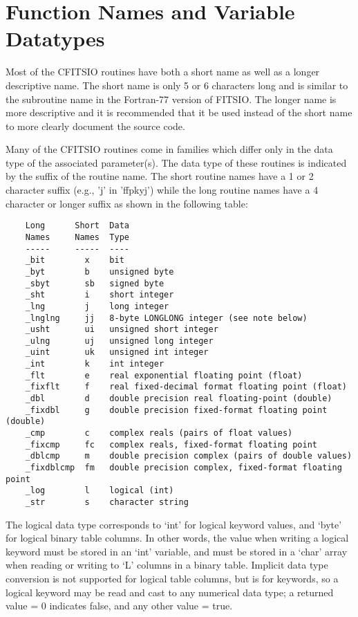 \documentclass[11pt]{book}
\begin{document}
\section{Function Names and Variable Datatypes}

Most of the CFITSIO routines have both a short name as well as a
longer descriptive name.  The short name is only 5 or 6 characters long
and is similar to the subroutine name in the Fortran-77 version of
FITSIO.  The longer name is more descriptive and it is recommended that
it be used instead of the short name to more clearly document the
source code.

Many of the CFITSIO routines come in families which differ only in the
data type of the associated parameter(s).  The data type of these
routines is indicated by the suffix of the routine name.  The short
routine names have a 1 or 2 character suffix (e.g., 'j' in 'ffpkyj')
while the long routine names have a 4 character or longer suffix
as shown in the following table:

\begin{verbatim}
    Long      Short  Data
    Names     Names  Type
    -----     -----  ----
    _bit        x    bit
    _byt        b    unsigned byte
    _sbyt       sb   signed byte
    _sht        i    short integer
    _lng        j    long integer
    _lnglng     jj   8-byte LONGLONG integer (see note below)
    _usht       ui   unsigned short integer
    _ulng       uj   unsigned long integer
    _uint       uk   unsigned int integer
    _int        k    int integer
    _flt        e    real exponential floating point (float)
    _fixflt     f    real fixed-decimal format floating point (float)
    _dbl        d    double precision real floating-point (double)
    _fixdbl     g    double precision fixed-format floating point (double)
    _cmp        c    complex reals (pairs of float values)
    _fixcmp     fc   complex reals, fixed-format floating point
    _dblcmp     m    double precision complex (pairs of double values)
    _fixdblcmp  fm   double precision complex, fixed-format floating point
    _log        l    logical (int)
    _str        s    character string
\end{verbatim}

The logical data type corresponds to `int' for logical keyword values,
and `byte' for logical binary table columns.  In other words, the value
when writing a logical keyword must be stored in an `int' variable, and
must be stored in a `char' array when reading or writing to `L' columns
in a binary table.  Implicit data type conversion is not supported for
logical table columns, but is for keywords, so a logical keyword may be
read and cast to any numerical data type; a returned value = 0
indicates false, and any other value = true.
\end{document}
